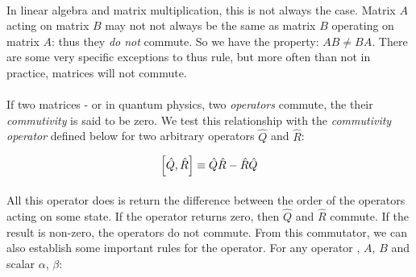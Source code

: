 \documentclass[12pt,letterpaper]{book}
\begin{document}
\paragraph*{}In linear algebra and matrix multiplication, this is not always the case. Matrix $A$ acting on matrix $B$ may not not always be the same as matrix $B$ operating on matrix $A$: thus they \textit{do not} commute. So we have the property: $AB \neq BA$. There are some very specific exceptions to thus rule, but more often than not in practice, matrices will not commute.

\paragraph*{}If two matrices - or in quantum physics, two \textit{operators} commute, the their \textit{commutivity} is said to be zero. We test this relationship with the \textit{commutivity operator} defined below for two arbitrary operators $\hat{Q}$ and $\hat{R}$:

\begin{equation}
\label{commutator operator}
\comm{\hat{Q}}{\hat{R}} \equiv \hat{Q}\hat{R} - \hat{R}\hat{Q}
\end{equation}

\paragraph*{}All this operator does is return the difference between the order of the operators acting on some state. If the operator returns zero, then $\hat{Q}$ and $\hat{R}$ commute. If the result is non-zero, the operators do not commute. From this commutator, we can also establish some important rules for the operator. For any operator , $A$, $B$ and scalar $\alpha$, $\beta$:
\end{document}

